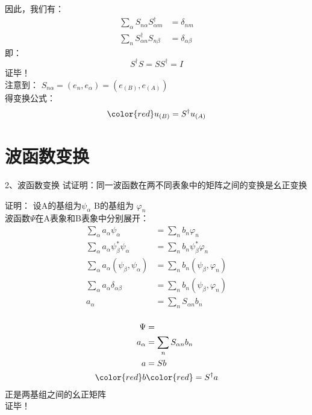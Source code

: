 \begin{frame} 
    因此，我们有：
    \begin{equation*}
        \begin{split}
            \sum_{\alpha} S_{n\alpha}   S^{\dagger } _{\alpha m} &=\delta_{nm} \\
            \sum_{n} S^{\dagger } _{\alpha n} S_{n\beta}&=\delta_{\alpha\beta}
        \end{split} 
    \end{equation*}
    即：$$ S^{\dagger }S=SS^{\dagger } =I$$ 
    证毕！ \\

    注意到： $ S_{n\alpha} = (e_n, e_\alpha)= (e_{(B)}, e_{(A)})$ \\
    得变换公式： $$ \color{red} u_{(B)}= S^{\dagger} u_ {(A)}$$
\end{frame}

\section{波函数变换}
\begin{frame} 
    \begin{tcolorbox1}{2、波函数变换}
        试证明：同一波函数在两不同表象中的矩阵之间的变换是幺正变换  
    \end{tcolorbox1}
    \alert{证明：} 设A的基组为$\psi_\alpha$ B的基组为 $\varphi_n$\\
    波函数$\Psi$在A表象和B表象中分别展开：
    \begin{equation*}
        \begin{split}
            \sum_\alpha a_\alpha \psi_\alpha &= \sum_n b_n \varphi_n \\
            \sum_\alpha a_\alpha \psi_\beta ^* \psi_\alpha &= \sum_n b_n \psi_\beta ^* \varphi_n \\
            \sum_\alpha a_\alpha (\psi_\beta, \psi_\alpha) &= \sum_n b_n (\psi_\beta, \varphi_n) \\
            \sum_\alpha a_\alpha \delta_{\alpha\beta} &= \sum_n b_n (\psi_\beta, \varphi_n) \\
            a_\alpha &= \sum_n S_{\alpha n} b_n\\
        \end{split} 
    \end{equation*}
\end{frame}

\begin{frame} 
    \begin{equation*}
        \begin{split}
            \Psi &= \\
            a_\alpha &= \sum_n S_{\alpha n} b_n\\
            a&=Sb\\
            \color{red} b& \color{red}=S^{\dagger}a   
        \end{split} 
    \end{equation*}
    正是两基组之间的幺正矩阵\\
    证毕！\\
\end{frame}

